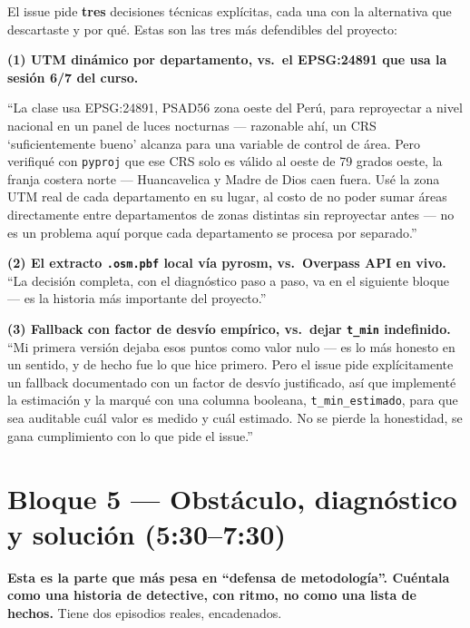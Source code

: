 \documentclass[11pt]{article}
\begin{document}
El issue pide \textbf{tres} decisiones técnicas explícitas, cada una con
la alternativa que descartaste y por qué. Estas son las tres más
defendibles del proyecto:

\begin{decirbox}
\textbf{(1) UTM dinámico por departamento, vs.\ el EPSG:24891 que usa la
sesión 6/7 del curso.}

``La clase usa EPSG:24891, PSAD56 zona oeste del Perú, para reproyectar a
nivel nacional en un panel de luces nocturnas --- razonable ahí, un CRS
`suficientemente bueno' alcanza para una variable de control de área. Pero
verifiqué con \texttt{pyproj} que ese CRS solo es válido al oeste de
79 grados oeste, la franja costera norte --- Huancavelica y Madre de Dios
caen fuera. Usé la zona UTM real de cada departamento en su lugar, al
costo de no poder sumar áreas directamente entre departamentos de zonas
distintas sin reproyectar antes --- no es un problema aquí porque cada
departamento se procesa por separado.''

\textbf{(2) El extracto \texttt{.osm.pbf} local vía pyrosm, vs.\ Overpass
API en vivo.} ``La decisión completa, con el diagnóstico paso a paso, va
en el siguiente bloque --- es la historia más importante del proyecto.''

\textbf{(3) Fallback con factor de desvío empírico, vs.\ dejar
\texttt{t\_min} indefinido.} ``Mi primera versión dejaba esos puntos como
valor nulo --- es lo más honesto en un sentido, y de hecho fue lo que
hice primero. Pero el issue pide explícitamente un fallback documentado
con un factor de desvío justificado, así que implementé la estimación y
la marqué con una columna booleana, \texttt{t\_min\_estimado}, para que
sea auditable cuál valor es medido y cuál estimado. No se pierde la
honestidad, se gana cumplimiento con lo que pide el issue.''
\end{decirbox}

\section{Bloque 5 --- Obstáculo, diagnóstico y solución (5:30--7:30)}

\textbf{Esta es la parte que más pesa en ``defensa de metodología''.
Cuéntala como una historia de detective, con ritmo, no como una lista de
hechos.} Tiene dos episodios reales, encadenados.
\end{document}
